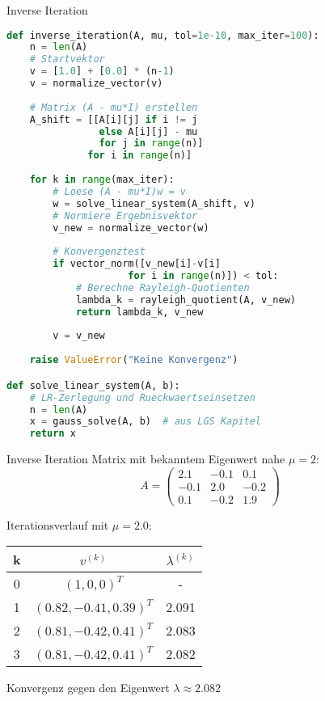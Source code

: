 \begin{examplecode}{Inverse Iteration}
\begin{lstlisting}[language=Python, style=basesmol]
def inverse_iteration(A, mu, tol=1e-10, max_iter=100):
    n = len(A)
    # Startvektor
    v = [1.0] + [0.0] * (n-1)
    v = normalize_vector(v)
    
    # Matrix (A - mu*I) erstellen
    A_shift = [[A[i][j] if i != j 
                else A[i][j] - mu 
                for j in range(n)] 
              for i in range(n)]
    
    for k in range(max_iter):
        # Loese (A - mu*I)w = v
        w = solve_linear_system(A_shift, v)
        # Normiere Ergebnisvektor
        v_new = normalize_vector(w)
        
        # Konvergenztest
        if vector_norm([v_new[i]-v[i] 
                     for i in range(n)]) < tol:
            # Berechne Rayleigh-Quotienten
            lambda_k = rayleigh_quotient(A, v_new)
            return lambda_k, v_new
            
        v = v_new
    
    raise ValueError("Keine Konvergenz")

def solve_linear_system(A, b):
    # LR-Zerlegung und Rueckwaertseinsetzen
    n = len(A)
    x = gauss_solve(A, b)  # aus LGS Kapitel
    return x
\end{lstlisting}
\end{examplecode}

\begin{example2}{Inverse Iteration}
Matrix mit bekanntem Eigenwert nahe $\mu = 2$:
$$A = \begin{pmatrix}
2.1 & -0.1 & 0.1\\
-0.1 & 2.0 & -0.2\\
0.1 & -0.2 & 1.9
\end{pmatrix}$$

Iterationsverlauf mit $\mu = 2.0$:
\begin{center}
\begin{tabular}{c|c|c}
k & $v^{(k)}$ & $\lambda^{(k)}$ \\\hline
0 & $(1, 0, 0)^T$ & -\\
1 & $(0.82, -0.41, 0.39)^T$ & 2.091\\
2 & $(0.81, -0.42, 0.41)^T$ & 2.083\\
3 & $(0.81, -0.42, 0.41)^T$ & 2.082
\end{tabular}
\end{center}

Konvergenz gegen den Eigenwert $\lambda \approx 2.082$
\end{example2}

